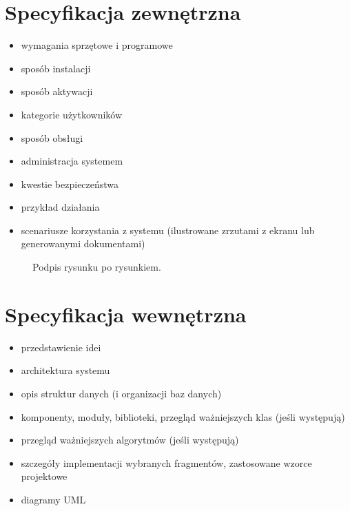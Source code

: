 \documentclass[a4paper,twoside,12pt]{book}
\begin{document}
\chapter{Specyfikacja zewnętrzna}
\begin{itemize}
\item  wymagania sprzętowe i programowe
\item  sposób instalacji
\item  sposób aktywacji
\item  kategorie użytkowników
\item  sposób obsługi
\item   administracja systemem
\item  kwestie bezpieczeństwa
\item  przykład działania
\item  scenariusze korzystania z systemu (ilustrowane zrzutami z ekranu lub generowanymi dokumentami)
\end{itemize}
 


\begin{figure}
\centering
{}
\caption{Podpis rysunku po rysunkiem.}
\label{fig:2}
\end{figure}

 

\chapter{Specyfikacja wewnętrzna}


 
\begin{itemize}
\item przedstawienie idei
\item architektura systemu
\item opis struktur danych (i organizacji baz danych)
\item komponenty, moduły, biblioteki, przegląd ważniejszych klas (jeśli występują)
\item przegląd ważniejszych algorytmów (jeśli występują)
\item szczegóły implementacji wybranych fragmentów, zastosowane wzorce projektowe
\item diagramy UML
\end{itemize}
\end{document}
